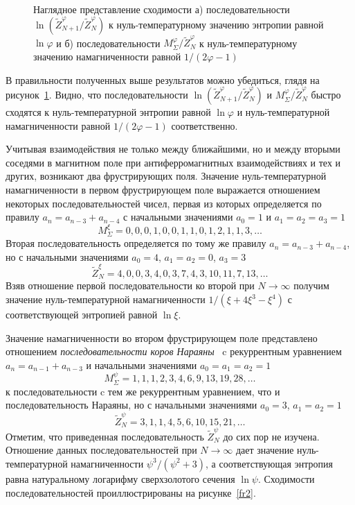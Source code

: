  \begin{figure}[h]
 	\begin{minipage}{0.49\linewidth}
 	\end{minipage}
 	\hfill
 	\begin{minipage}{0.49\linewidth}
 	\end{minipage}
 	\caption{Наглядное представление сходимости а) последовательности $\ln (\widetilde{Z}_{N+1}^{\varphi}/\widetilde{Z}_{N}^{\varphi})$ к нуль-температурному значению энтропии равной $\ln \varphi$ и б) последовательности $M_{\Sigma}^{\varphi}/\widetilde{Z}_{N}^{\varphi}$ к нуль-температурному значению намагниченности равной $1/(2\varphi - 1)$}
 	\label{fr1}
 \end{figure}

В правильности полученных выше результатов можно убедиться, глядя на рисунок~\ref{fr1}. Видно, что последовательности $\ln (\widetilde{Z}_{N+1}^{\varphi}/\widetilde{Z}_{N}^{\varphi})$ и $M_{\Sigma}^{\varphi}/\widetilde{Z}_{N}^{\varphi}$ быстро сходятся к нуль-температурной энтропии равной $\ln \varphi$ и нуль-температурной намагниченности равной $1/(2\varphi - 1)$ соответственно.

Учитывая взаимодействия не только между ближайшими, но и между вторыми соседями в магнитном поле при антиферромагнитных взаимодействиях и тех и других, возникают два фрустрирующих поля. Значение нуль-температурной намагниченности в первом фрустрирующем поле выражается отношением некоторых последовательностей чисел, первая из которых определяется по правилу $a_n = a_{n-3} + a_{n-4}$ с начальными значениями $a_0 = 1$ и $a_1 = a_2 = a_3 = 1$
\[M^{\xi}_{\Sigma} = 0, 0, 0, 1, 0, 0, 1, 1, 0, 1, 2, 1, 1, 3, \dots\]
Вторая последовательность определяется по тому же правилу $a_n = a_{n-3} + a_{n-4}$, но с начальными значениями $a_0 = 4$, $a_1 = a_2 = 0$, $a_3 = 3$  \[\widetilde{Z}^{\xi}_{N} = 4, 0, 0, 3, 4, 0, 3, 7, 4, 3, 10, 11, 7, 13, \dots\]
Взяв отношение первой последовательности ко второй при $N\rightarrow \infty$ получим значение нуль-температурной намагниченности $1/(\xi+4\xi^3-\xi^4)$ с соответствующей энтропией равной $\ln \xi$.

Значение намагниченности во втором фрустрирующем поле представлено отношением \emph{последовательности коров Нараяны}~\cite{allouche1996, lin2021} c рекуррентным уравнением $a_n = a_{n-1} + a_{n-3}$ и начальными значениями $a_0 = a_1 = a_2 = 1$
\[M^{\psi}_{\Sigma} = 1, 1, 1 , 2, 3, 4, 6, 9, 13, 19, 28, \dots\] к последовательности c тем же рекуррентным уравнением, что и последовательность Нараяны, но с начальными значениями $a_0 = 3$, $a_1 = a_2 = 1$ \[\widetilde{Z}^{\psi}_{N} = 3, 1, 1, 4, 5, 6, 10, 15, 21, \dots\] Отметим, что приведенная последовательность $\widetilde{Z}^{\psi}_{N}$ до сих пор не изучена. 
Отношение данных последовательностей при $N\rightarrow \infty$ дает значение нуль-температурной намагниченности $\psi^3/(\psi^2+3)$, а соответствующая энтропия равна натуральному логарифму сверхзолотого сечения $\ln \psi$. Сходимости последовательностей проиллюстрированы на рисунке~\ref{fr2}.

